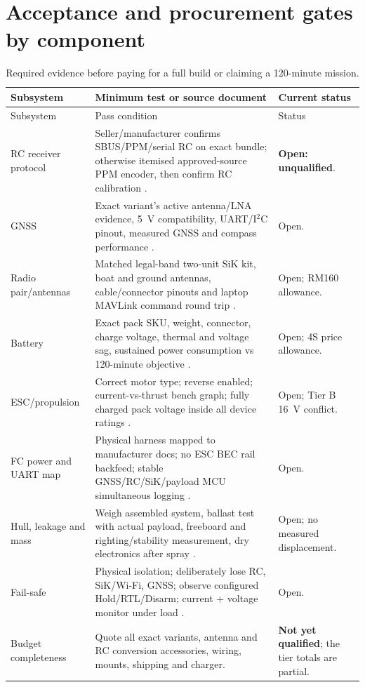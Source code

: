 \section{Acceptance and procurement gates by component}
\label{sec:accept}
\begin{longtable}{L{32mm}L{87mm}L{39mm}}
\caption{Required evidence before paying for a full build or claiming a 120-minute mission.}\label{tab:acceptance}\\
\toprule Subsystem & Minimum test or source document & Current status \\\midrule\endfirsthead
\toprule Subsystem & Pass condition & Status \\\midrule\endhead\bottomrule\endfoot
RC receiver protocol & Seller/manufacturer confirms SBUS/PPM/serial RC on exact bundle; otherwise itemised approved-source PPM encoder, then confirm RC calibration \cite{coreDoc,hotrcCurrent,rcPWMEncoder}. & \textbf{Open: unqualified}.\\
GNSS & Exact variant's active antenna/LNA evidence, 5~V compatibility, UART/I$^2$C pinout, measured GNSS and compass performance \cite{bnShop,bnData,coreDoc}. & Open.\\
Radio pair/antennas & Matched legal-band two-unit SiK kit, boat and ground antennas, cable/connector pinouts and laptop MAVLink command round trip \cite{radioDoc,radioShop}. & Open; RM160 allowance.\\
Battery & Exact pack SKU, weight, connector, charge voltage, thermal and voltage sag, sustained power consumption vs 120-minute objective \cite{bat22,bat52,bat4Shopee}. & Open; 4S price allowance.\\
ESC/propulsion & Correct motor type; reverse enabled; current-vs-thrust bench graph; fully charged pack voltage inside all device ratings \cite{m060Shop,hobbyShop,ztwDoc,mdd10}. & Open; Tier B 16~V conflict.\\
FC power and UART map & Physical harness mapped to manufacturer docs; no ESC BEC rail backfeed; stable GNSS/RC/SiK/payload MCU simultaneous logging \cite{coreDoc}. & Open.\\
Hull, leakage and mass & Weigh assembled system, ballast test with actual payload, freeboard and righting/stability measurement, dry electronics after spray \cite{pipe,box,project}. & Open; no measured displacement.\\
Fail-safe & Physical isolation; deliberately lose RC, SiK/Wi-Fi, GNSS; observe configured Hold/RTL/Disarm; current + voltage monitor under load \cite{failsafes,coreDoc,kill}. & Open.\\
Budget completeness & Quote all exact variants, antenna and RC conversion accessories, wiring, mounts, shipping and charger. & \textbf{Not yet qualified}; the tier totals are partial.\\
\end{longtable}

